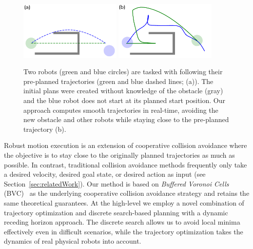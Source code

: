\documentclass{svproc}
\begin{document}
\begin{figure}
\includegraphics[width=0.45\textwidth]{images/swap2_initial.pdf}
\hfill
\includegraphics[width=0.45\textwidth]{images/swap2_final.pdf}
\caption{Two robots (green and blue circles) are tasked with following their pre-planned trajectories (green and blue dashed lines; (a)).
The initial plans were created without knowledge of the obstacle (gray) and the blue robot does not start at its planned start position.
Our approach computes smooth trajectories in real-time, avoiding the new obstacle and other robots while staying close to the pre-planned trajectory (b).
}
\label{fig:swap2}
\end{figure}

Robust motion execution is an extension of cooperative collision avoidance where the objective is to stay close to the originally planned trajectories as much as possible.
In contrast, traditional collision avoidance methods frequently only take a desired velocity, desired goal state, or desired action as input (see Section~\ref{sec:relatedWork}).
Our method is based on \emph{Buffered Voronoi Cells} (BVC)~\cite{bufferedVoronoiCells} as the underlying cooperative collision avoidance strategy and retains the same theoretical guarantees.
At the high-level we employ a novel combination of trajectory optimization and discrete search-based planning with a dynamic receding horizon approach.
The discrete search allows us to avoid local minima effectively even in difficult scenarios, while the trajectory optimization takes the dynamics of real physical robots into account.
\end{document}
